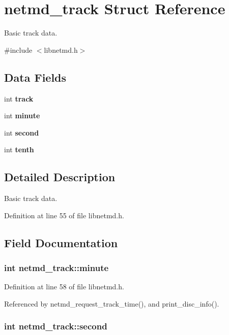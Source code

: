 \section{netmd\_\-track Struct Reference}
\label{structnetmd__track}


Basic track data.  


{\ttfamily \#include $<$libnetmd.h$>$}\subsection*{Data Fields}
\begin{DoxyCompactItemize}
\item 
int {\bf track}
\item 
int {\bf minute}
\item 
int {\bf second}
\item 
int {\bf tenth}
\end{DoxyCompactItemize}


\subsection{Detailed Description}
Basic track data. 

Definition at line 55 of file libnetmd.h.

\subsection{Field Documentation}
\subsubsection[{minute}]{\setlength{\rightskip}{0pt plus 5cm}int {\bf netmd\_\-track::minute}}\label{structnetmd__track_adc3d83d0b9857c6deb85cd4f3d2ae842}


Definition at line 58 of file libnetmd.h.

Referenced by netmd\_\-request\_\-track\_\-time(), and print\_\-disc\_\-info().
\subsubsection[{second}]{\setlength{\rightskip}{0pt plus 5cm}int {\bf netmd\_\-track::second}}\label{structnetmd__track_ad9dbeb8a6297cb5771f547d09dc20825}


